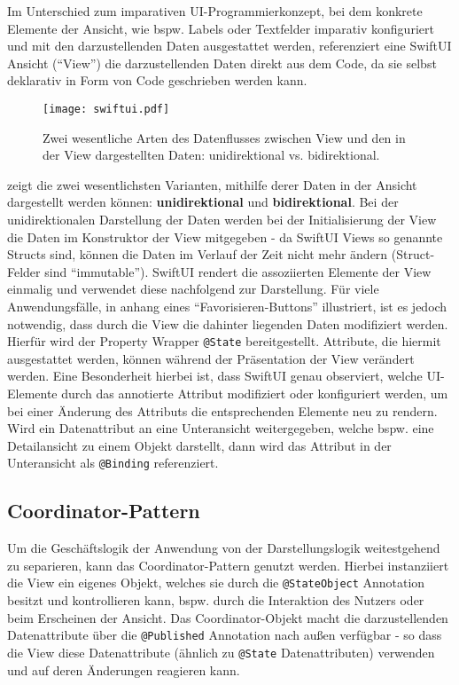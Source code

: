 Im Unterschied zum imparativen UI-Programmierkonzept, bei dem konkrete Elemente der Ansicht, wie bspw. Labels oder Textfelder imparativ konfiguriert und mit den darzustellenden Daten ausgestattet werden, referenziert eine SwiftUI Ansicht (\enquote{View}) die darzustellenden Daten direkt aus dem Code, da sie selbst deklarativ in Form von Code geschrieben werden kann.

\begin{figure}[H]
\texttt{[image: swiftui.pdf]}
\caption{Zwei wesentliche Arten des Datenflusses zwischen View und den in der View dargestellten Daten: unidirektional vs. bidirektional.}\label{fig:swiftui}
\end{figure}

 zeigt die zwei wesentlichsten Varianten, mithilfe derer Daten in der Ansicht dargestellt werden können: \textbf{unidirektional} und \textbf{bidirektional}. Bei der unidirektionalen Darstellung der Daten werden bei der Initialisierung der View die Daten im Konstruktor der View mitgegeben - da SwiftUI Views so genannte Structs sind, können die Daten im Verlauf der Zeit nicht mehr ändern (Struct-Felder sind \enquote{immutable}). SwiftUI rendert die assoziierten Elemente der View einmalig und verwendet diese nachfolgend zur Darstellung. Für viele Anwendungsfälle, in  anhang eines \enquote{Favorisieren-Buttons} illustriert, ist es jedoch notwendig, dass durch die View die dahinter liegenden Daten modifiziert werden. Hierfür wird der Property Wrapper \texttt{@State} bereitgestellt. Attribute, die hiermit ausgestattet werden, können während der Präsentation der View verändert werden. Eine Besonderheit hierbei ist, dass SwiftUI genau observiert, welche UI-Elemente durch das annotierte Attribut modifiziert oder konfiguriert werden, um bei einer Änderung des Attributs die entsprechenden Elemente neu zu rendern. Wird ein Datenattribut an eine Unteransicht weitergegeben, welche bspw. eine Detailansicht zu einem Objekt darstellt, dann wird das Attribut in der Unteransicht als \texttt{@Binding} referenziert.

\subsection{Coordinator-Pattern}

Um die Geschäftslogik der Anwendung von der Darstellungslogik weitestgehend zu separieren, kann das Coordinator-Pattern genutzt werden. Hierbei instanziiert die View ein eigenes Objekt, welches sie durch die \texttt{@StateObject} Annotation besitzt und kontrollieren kann, bspw. durch die Interaktion des Nutzers oder beim Erscheinen der Ansicht. Das Coordinator-Objekt macht die darzustellenden Datenattribute über die \texttt{@Published} Annotation nach außen verfügbar - so dass die View diese Datenattribute (ähnlich zu \texttt{@State} Datenattributen) verwenden und auf deren Änderungen reagieren kann.

